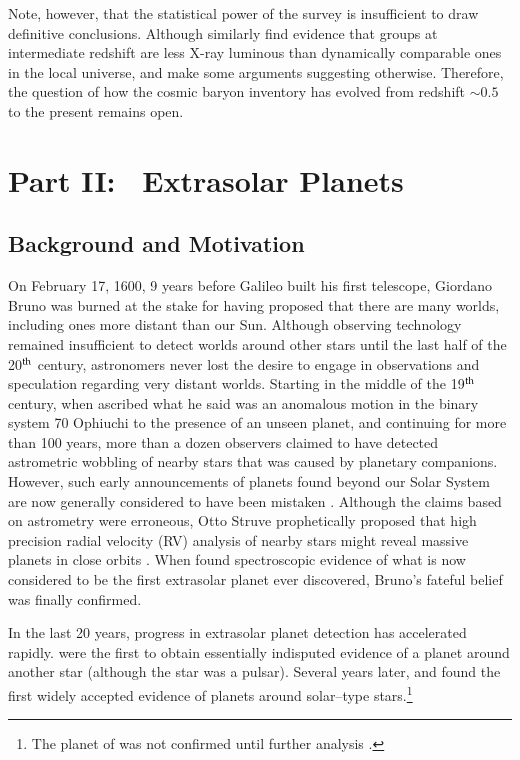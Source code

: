 Note, however, that the statistical power of the survey is
insufficient to draw definitive conclusions.  Although
\citet{fang_et_al2007} similarly find evidence that groups at
intermediate redshift are less X-ray luminous than dynamically
comparable ones in the local universe, \citet{andreon_et_al2008} and
\citet{fassnacht_et_al2007} make some arguments suggesting otherwise.
Therefore, the question of how the cosmic baryon inventory has evolved from
redshift $\sim 0.5$ to the present remains open.



\section[Part II: ~Extrasolar Planets]{Part II: ~Extrasolar Planets}
\label{intro_sec:exoplanets}
\subsection[Background and Motivation]{Background and Motivation}
\label{intro_ssec:planets background}
On February 17, 1600, 9 years before Galileo built his first
telescope, Giordano Bruno was burned at the stake for having proposed
that there are many worlds, including ones more distant than our Sun.
Although observing technology remained insufficient to detect worlds
around other stars until the last half of the 20$^{\rm th}$ century,
astronomers never lost the desire to engage in observations and
speculation regarding very distant worlds.  Starting in the middle of
the 19$^{\rm th}$ century, when \citet{jacob1855} ascribed what he
said was an anomalous motion in the binary system 70 Ophiuchi to the
presence of an unseen planet, and continuing for more than 100 years,
more than a dozen observers claimed to have detected astrometric
wobbling of nearby stars that was caused by planetary companions.
However, such early announcements of planets found beyond our Solar
System are now generally considered to have been mistaken
\citep{batten_et_al1984,heintz1988}.  Although the claims based on
astrometry were erroneous, Otto Struve prophetically proposed that
high precision radial velocity (RV) analysis of nearby stars might
reveal massive planets in close orbits \citep{struve1952}.  When
\citet{campbell_et_al1988} found spectroscopic evidence of what is now
considered to be the first extrasolar planet ever discovered, Bruno's
fateful belief was finally confirmed.

In the last 20 years, progress in extrasolar planet detection has
accelerated rapidly.  \citet{wolszczan+frail1992} were the first to
obtain essentially indisputed evidence of a planet around another star
(although the star was a pulsar).  Several years later,
\citet{mayor+queloz1995} and \citet{marcy+butler1996} found the first
widely accepted evidence of planets around solar--type
stars.\footnote{The planet of \citet{campbell_et_al1988} was not
confirmed until further analysis \citep{hatzes_et_al2003}.}

